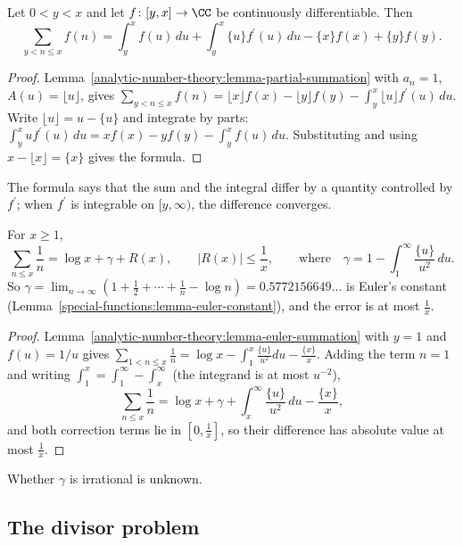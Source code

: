 \begin{lemma}\label{analytic-number-theory:lemma-euler-summation}
Let $0 < y < x$ and let $f \colon [y, x] \to \CC$ be continuously differentiable. Then
\[
\sum_{y < n \leq x}f(n) = \int_y^xf(u)\,du + \int_y^x\{u\}f^{\prime}(u)\,du - \{x\}f(x) + \{y\}f(y).
\]
\end{lemma}

\begin{proof}
Lemma~\ref{analytic-number-theory:lemma-partial-summation} with $a_n = 1$, $A(u) = \lfloor u\rfloor$, gives $\sum_{y < n \leq x}f(n) = \lfloor x\rfloor f(x) - \lfloor y\rfloor f(y) - \int_y^x\lfloor u\rfloor f^{\prime}(u)\,du$.
Write $\lfloor u\rfloor = u - \{u\}$ and integrate by parts: $\int_y^xuf^{\prime}(u)\,du = xf(x) - yf(y) - \int_y^xf(u)\,du$. Substituting and using $x - \lfloor x\rfloor = \{x\}$ gives the formula.
\end{proof}

The formula says that the sum and the integral differ by a quantity controlled by $f^{\prime}$; when $f^{\prime}$ is integrable on $[y, \infty)$, the difference converges.

\begin{proposition}\label{analytic-number-theory:proposition-harmonic}
For $x \geq 1$,
\[
\sum_{n \leq x}\frac1n = \log x + \gamma + R(x), \qquad |R(x)| \leq \frac1x, \qquad \text{where} \quad \gamma = 1 - \int_1^\infty\frac{\{u\}}{u^2}\,du.
\]
So $\gamma = \lim_{n \to \infty}(1 + \frac12 + \cdots + \frac1n - \log n) = 0.5772156649\ldots$ is Euler's constant (Lemma~\ref{special-functions:lemma-euler-constant}), and the error is at most $\frac1x$.
\end{proposition}

\begin{proof}
Lemma~\ref{analytic-number-theory:lemma-euler-summation} with $y = 1$ and $f(u) = 1/u$ gives $\sum_{1 < n \leq x}\frac1n = \log x - \int_1^x\frac{\{u\}}{u^2}du - \frac{\{x\}}{x}$. Adding the term $n = 1$
and writing $\int_1^x = \int_1^\infty - \int_x^\infty$ (the integrand is at most $u^{-2}$),
\[
\sum_{n \leq x}\frac1n = \log x + \gamma + \int_x^\infty\frac{\{u\}}{u^2}\,du - \frac{\{x\}}{x},
\]
and both correction terms lie in $[0, \frac1x]$, so their difference has absolute value at most $\frac1x$.
\end{proof}

Whether $\gamma$ is irrational is unknown.

\subsection{The divisor problem}\label{analytic-number-theory:subsection-divisor-problem}

